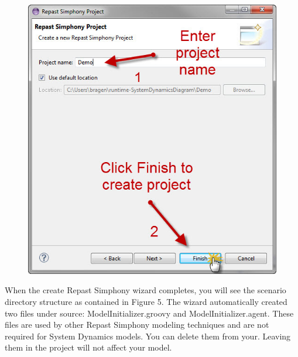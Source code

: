 \documentclass[11pt]{amsart}
\begin{document}
\begin{figure}[ht]
\begin{center}
\vspace{.2in}
\centerline {
\includegraphics[totalheight=0.35\textheight]{images/004.jpg}
}
\caption{}
\label{fig:004}
\end{center}
\end{figure}

When the create Repast Simphony wizard completes, you will see the scenario directory structure as contained in Figure 5. The wizard automatically created two files under source: ModelInitializer.groovy and ModelInitializer.agent. These files are used by other Repast Simphony modeling techniques and are not required for System Dynamics models. You can delete them from your. Leaving them in the project will not affect your model.
\end{document}
